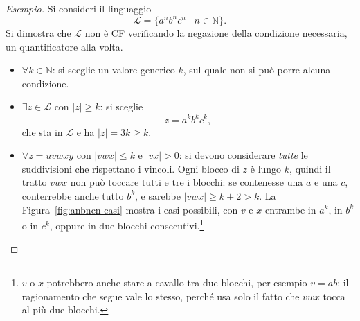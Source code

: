 \documentclass[a4paper, 11pt, oneside]{book}
\theoremstyle{formale}
\newenvironment{esempio}
    {\begin{proof}[\textit{Esempio}]\renewcommand{\qedsymbol}{$\diamond$}}
    {\end{proof}}
\begin{document}
    \begin{esempio}
        Si consideri il linguaggio
        \begin{equation*}
            \mathcal{L} = \{a^n b^n c^n \mid n \in \mathbb{N}\}.
        \end{equation*}
        Si dimostra che $\mathcal{L}$ non \`e CF verificando la negazione della condizione
        necessaria, un quantificatore alla volta.
        \begin{itemize}
            \item $\forall k \in \mathbb{N}$: si sceglie un valore generico $k$, sul
                quale non si pu\`o porre alcuna condizione.
            \item $\exists z \in \mathcal{L}$ con $|z| \geq k$: si sceglie
                \begin{equation*}
                    z = a^k b^k c^k,
                \end{equation*}
                che sta in $\mathcal{L}$ e ha $|z| = 3k \geq k$.
            \item $\forall z = uvwxy$ con $|vwx| \leq k$ e $|vx| > 0$: si devono
                considerare \emph{tutte} le suddivisioni che rispettano i vincoli. Ogni
                blocco di $z$ \`e lungo $k$, quindi il tratto $vwx$ non pu\`o toccare
                tutti e tre i blocchi: se contenesse una $a$ e una $c$, conterrebbe
                anche tutto $b^k$, e sarebbe $|vwx| \geq k + 2 > k$. La
                Figura~\ref{fig:anbncn-casi} mostra i casi possibili, con $v$ e $x$
                entrambe in $a^k$, in $b^k$ o in $c^k$, oppure in due blocchi
                consecutivi.\footnote{$v$ o $x$ potrebbero anche stare a cavallo tra
                due blocchi, per esempio $v = ab$: il ragionamento che segue vale lo
                stesso, perch\'e usa solo il fatto che $vwx$ tocca al pi\`u due
                blocchi.}
        \end{itemize}

        \begin{figure}[H]
            \centering
\end{figure}
\end{esempio}
\end{document}
